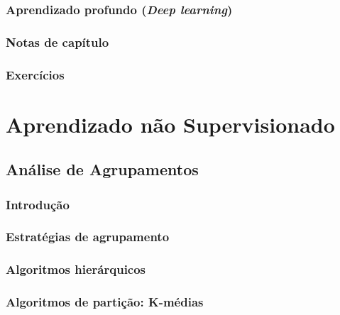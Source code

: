 \documentclass[
]{latex/krantz}
\theoremstyle{definition}
\theoremstyle{definition}
\theoremstyle{definition}
\theoremstyle{definition}
\theoremstyle{remark}
\begin{document}
\hypertarget{aprendizado-profundo-deep-learning}{%
\section{\texorpdfstring{Aprendizado profundo (\emph{Deep learning})}{Aprendizado profundo (Deep learning)}}\label{aprendizado-profundo-deep-learning}}

\hypertarget{notas-de-capuxedtulo-10}{%
\section{Notas de capítulo}\label{notas-de-capuxedtulo-10}}

\hypertarget{exercuxedcios-10}{%
\section{Exercícios}\label{exercuxedcios-10}}

\hypertarget{part-aprendizado-nuxe3o-supervisionado}{%
\part{Aprendizado não Supervisionado}\label{part-aprendizado-nuxe3o-supervisionado}}

\hypertarget{anuxe1lise-de-agrupamentos}{%
\chapter{Análise de Agrupamentos}\label{anuxe1lise-de-agrupamentos}}

\hypertarget{introduuxe7uxe3o-11}{%
\section{Introdução}\label{introduuxe7uxe3o-11}}

\hypertarget{estratuxe9gias-de-agrupamento}{%
\section{Estratégias de agrupamento}\label{estratuxe9gias-de-agrupamento}}

\hypertarget{algoritmos-hieruxe1rquicos}{%
\section{Algoritmos hierárquicos}\label{algoritmos-hieruxe1rquicos}}

\hypertarget{algoritmos-de-partiuxe7uxe3o-k-muxe9dias}{%
\section{Algoritmos de partição: K-médias}\label{algoritmos-de-partiuxe7uxe3o-k-muxe9dias}}
\end{document}
